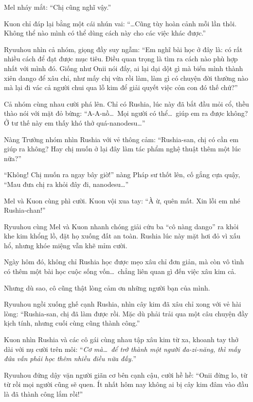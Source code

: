 \documentclass[../main.tex]{subfiles}
\begin{document}
Mel nháy mắt: ``Chị cũng nghĩ vậy.''

Kuon chỉ đáp lại bằng một cái nhún vai: ``\dots Cũng tùy hoàn cảnh mỗi lần thôi. Không thể nào mình có thể dùng cách này cho các việc khác được.''

Ryuuhou nhìn cả nhóm, giọng đầy suy ngẫm: ``Em nghĩ bài học ở đây là: có rất nhiều cách để đạt được mục tiêu. Điều quan trọng là tìm ra cách nào phù hợp nhất với mình đó. Giống như Onii nói đấy, ai lại dại dột gì mà biến mình thành xiên dango để xâu chỉ, như mấy chị vừa rồi làm, làm gì có chuyện đời thường nào mà lại đi vác cả người chui qua lỗ kim để giải quyết việc cỏn con đó thế chứ?''

Cả nhóm cùng nhau cười phá lên. Chỉ có Rushia, lúc này đã bắt đầu mỏi cổ, thều thào nói với mặt đỏ bừng: ``A-A-nồ\dots\ Mọi người có thể\dots\ giúp em ra được không? Ở tư thế này em thấy khó thở quá-nanodesu\dots''

Nàng Trưởng nhóm nhìn Rushia với vẻ thông cảm: ``Rushia-san, chị có cần em giúp ra không? Hay chị muốn ở lại đây làm tác phẩm nghệ thuật thêm một lúc nữa?''

``Không! Chị muốn ra ngay bây giờ!'' nàng Pháp sư thốt lên, cố gắng cựa quậy, ``Mau đưa chị ra khỏi đây đi, nanodesu\dots''

Mel và Kuon cùng phì cười. Kuon vội xua tay: ``À ừ, quên mất. Xin lỗi em nhé Rushia-chan!''

Ryuuhou cùng Mel và Kuon nhanh chóng giải cứu ba ``cô nàng dango'' ra khỏi khe kim khổng lồ, đặt họ xuống đất an toàn. Rushia lúc này mặt hơi đỏ vì xấu hổ, nhưng khóe miệng vẫn khẽ mỉm cười.

Ngày hôm đó, không chỉ Rushia học được mẹo xâu chỉ đơn giản, mà còn vô tình có thêm một bài học cuộc sống vốn\dots\ chẳng liên quan gì đến việc xâu kim cả.

Nhưng dù sao, cô cũng thật lòng cảm ơn những người bạn của mình.

Ryuuhou ngồi xuống ghế cạnh Rushia, nhìn cây kim đã xâu chỉ xong với vẻ hài lòng: ``Rushia-san, chị đã làm được rồi. Mặc dù phải trải qua một câu chuyện đầy kịch tính, nhưng cuối cùng cũng thành công.''

Kuon nhìn Rushia và các cô gái cùng nhau tập xâu kim từ xa, khoanh tay thở dài với nụ cười trên môi: ``\textit{Cơ mà\dots\ để trở thành một người đa-zi-năng, thì mấy đứa vẫn phải học thêm nhiều điều nữa đấy.}''

Ryuuhou đứng dậy vặn người giãn cơ bên cạnh cậu, cười hề hề: ``Onii đừng lo, từ từ rồi mọi người cũng sẽ quen. Ít nhất hôm nay không ai bị cây kim đâm vào đầu là đã thành công lắm rồi!''
\end{document}
